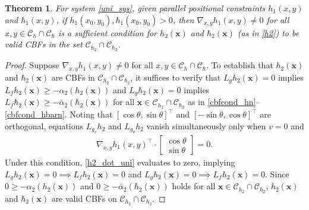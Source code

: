 \documentclass[letterpaper, 10 pt, conference]{ieeeconf}
\newtheorem{theorem}{Theorem}
\begin{document}
\begin{theorem}\label{thrm_uni_parallel_cbf}
    For system \eqref{uni_sys}, given parallel positional constraints $h_1(x,y)$ and $\hbar_1(x,y)$, if $h_1(x_0,y_0),\hbar_1(x_0,y_0) > 0$, then $\nabla_{x,y} h_1(x,y) \neq 0$ for all $x,y \in \mathcal{C}_{h}\cap\mathcal{C}_{\hbar}$ is a sufficient condition for $h_2(\mathbf{x})$ and $\hbar_2(\mathbf{x})$ (as in \eqref{h2}) to be valid CBFs in the set $\mathcal{C}_{h_2}\cap\mathcal{C}_{\hbar_2}$.
\end{theorem}
\begin{proof}
    Suppose $\nabla_{x,y}h_1(x,y) \neq 0$ for all $x,y \in \mathcal{C}_{h}\cap\mathcal{C}_{\hbar}$. To establish that $h_2(\mathbf{x})$ and $\hbar_2(\mathbf{x})$ are CBFs in $\mathcal{C}_{h_2}\cap\mathcal{C}_{\hbar_2}$, it suffices to verify that $L_g h_2(\mathbf{x}) = 0$ implies $L_f h_2(\mathbf{x}) \geq -\alpha_2(h_2(\mathbf{x}))$ and $L_g \hbar_2(\mathbf{x}) = 0$ implies $L_f \hbar_2(\mathbf{x}) \geq -\bar{\alpha}_2(\hbar_2(\mathbf{x}))$ for all $\mathbf{x} \in \mathcal{C}_{h_2}\cap\mathcal{C}_{\hbar_2}$ as in \eqref{cbfcond_hn}--\eqref{cbfcond_hbarn}. Noting that $[\cos\theta, \sin\theta]^\top$ and $[-\sin\theta, \cos\theta]^\top$ are orthogonal, equations $L_{g_v}h_2$ and $L_{g_\theta}h_2$ vanish simultaneously only when $v = 0$ and  
    \begin{align}
        \nabla_{x,y} h_1(x,y)^\top \cdot\begin{bmatrix}
            \cos\theta \\ \sin\theta
        \end{bmatrix} = 0.
    \end{align}  
    Under this condition, \eqref{h2_dot_uni} evaluates to zero, implying $L_g h_2(\mathbf{x}) = 0 \implies L_f h_2(\mathbf{x}) = 0$ and $L_g \hbar_2(\mathbf{x}) = 0 \implies L_f \hbar_2(\mathbf{x}) = 0$. Since $0 \geq -\alpha_2(h_2(\mathbf{x}))$ and $0 \geq -\bar{\alpha}_2(\hbar_2(\mathbf{x}))$ holds for all $\mathbf{x} \in \mathcal{C}_{h_2}\cap\mathcal{C}_{\hbar_2}$,  $h_2(\mathbf{x})$ and $\hbar_2(\mathbf{x})$ are valid CBFs on $\mathcal{C}_{h_2}\cap\mathcal{C}_{\hbar_2}$.
\end{proof}


\end{document}
